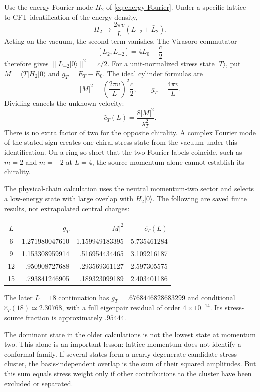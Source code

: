 Use the energy Fourier mode $H_2$ of \eqref{eq:energy-Fourier}. Under a
specific lattice-to-CFT identification of the energy density,
\begin{equation}
 H_2\longrightarrow\frac{2\pi v}{L}(L_{-2}+\bar L_2).
 \label{eq:stress-mode-assumption}
\end{equation}
Acting on the vacuum, the second term vanishes. The Virasoro commutator
\[
 [L_2,L_{-2}]=4L_0+\frac c2
\]
therefore gives $\|L_{-2}|0\rangle\|^2=c/2$. For a unit-normalized
stress state $|T\rangle$, put
$M=\langle T|H_2|0\rangle$ and $g_T=E_T-E_0$. The ideal cylinder
formulas are
\[
 |M|^2=\left(\frac{2\pi v}{L}\right)^2\frac c2,
 \qquad g_T=\frac{4\pi v}{L}.
\]
Dividing cancels the unknown velocity:
\begin{equation}
 \widehat c_T(L)=\frac{8|M|^2}{g_T^2}.
 \label{eq:stress-c-estimator}
\end{equation}
There is no extra factor of two for the opposite chirality. A complex
Fourier mode of the stated sign creates one chiral stress state from the
vacuum under this identification. On a ring so short that the two
Fourier labels coincide, such as $m=2$ and $m=-2$ at $L=4$, the
source momentum alone cannot establish its chirality.

\begin{numericalrecord}
The physical-chain calculation uses the neutral momentum-two sector and
selects a low-energy state with large overlap with $H_2|0\rangle$. The
following are saved finite results, not extrapolated central charges:
\begin{center}
\begin{tabular}{c r r r}
$L$ & $g_T$ & $|M|^2$ & $\widehat c_T(L)$\\\hline
6 &1.271980047610&1.159949183395&5.735461284\\
9 &1.153308959914& .516954434465&3.109216187\\
12& .950908727688& .293569361127&2.597305575\\
15& .793841246905& .189323099189&2.403401186
\end{tabular}
\end{center}
The later $L=18$ continuation has $g_T=.6768446828683299$ and conditional
$\widehat c_T(18)\simeq2.30768$, with a full eigenpair residual of order
$4\times10^{-14}$. Its stress-source fraction is approximately $.95444$.
\end{numericalrecord}

The dominant state in the older calculations is not the lowest state at
momentum two. This alone is an important lesson: lattice momentum does
not identify a conformal family. If several states form a nearly
degenerate candidate stress cluster, the basis-independent overlap is
the sum of their squared amplitudes. But this sum equals stress weight
only if other contributions to the cluster have been excluded or
separated.

